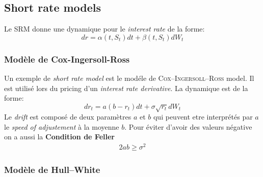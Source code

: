 \documentclass[a4paper]{article}
\begin{document}
\subsection{Short rate models}
Le SRM donne une dynamique pour le \textit{interest rate} de la forme:
\begin{equation*}
    dr = \alpha (t,S_t) dt + \beta (t,S_t) dW_t
\end{equation*}

\subsubsection{Modèle de Cox-Ingersoll-Ross}
Un exemple de \textit{short rate model} est le modéle de \textsc{Cox--Ingersoll--Ross} model. Il est utilisé lors du pricing d'un \textit{interest rate derivative}. La dynamique est de la forme:
\begin{equation*}
    dr_t = a(b-r_t)dt + \sigma \sqrt{r_t}dW_t
\end{equation*}
Le \textit{drift} est composé de deux paramètres $a$ et $b$ qui peuvent etre interprétés par $a$ le \textit{speed of adjustement} à la moyenne $b$. Pour éviter d'avoir des valeurs négative on a aussi la \textbf{Condition de Feller}
\begin{align*}
    2ab \geq \sigma ^2
\end{align*}

\subsubsection{Modèle de Hull--White}
\end{document}

